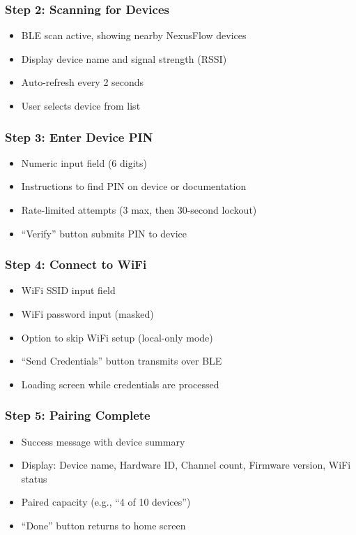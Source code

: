 \subsubsection{Step 2: Scanning for Devices}
\begin{itemize}
    \item BLE scan active, showing nearby NexusFlow devices
    \item Display device name and signal strength (RSSI)
    \item Auto-refresh every 2 seconds
    \item User selects device from list
\end{itemize}

\subsubsection{Step 3: Enter Device PIN}
\begin{itemize}
    \item Numeric input field (6 digits)
    \item Instructions to find PIN on device or documentation
    \item Rate-limited attempts (3 max, then 30-second lockout)
    \item ``Verify'' button submits PIN to device
\end{itemize}

\subsubsection{Step 4: Connect to WiFi}
\begin{itemize}
    \item WiFi SSID input field
    \item WiFi password input (masked)
    \item Option to skip WiFi setup (local-only mode)
    \item ``Send Credentials'' button transmits over BLE
    \item Loading screen while credentials are processed
\end{itemize}

\subsubsection{Step 5: Pairing Complete}
\begin{itemize}
    \item Success message with device summary
    \item Display: Device name, Hardware ID, Channel count, Firmware version, WiFi status
    \item Paired capacity (e.g., ``4 of 10 devices'')
    \item ``Done'' button returns to home screen
\end{itemize}

